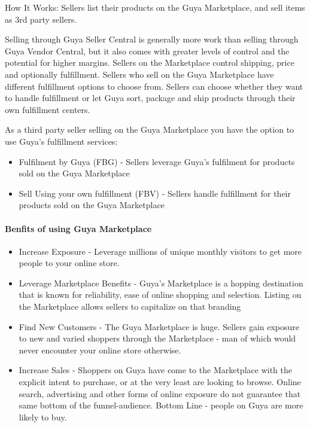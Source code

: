 How It Works: Sellers list their products on the Guya Marketplace, and sell items as 3rd party sellers.

Selling through Guya Seller Central is generally more work than selling through Guya Vendor Central, but it also comes with greater levels of control and the potential for higher margins. Sellers on the Marketplace control shipping, price and optionally fulfillment. Sellers who sell on the Guya Marketplace have different fulfillment options to choose from. Sellers can choose whether they want to handle fulfillment or let Guya sort, package and ship products through their own fulfillment centers.

As a third party seller selling on the Guya Marketplace you have the option to use Guya's fulfillment services:

\begin{itemize}
	\item Fulfilment by Guya (FBG) - Sellers leverage Guya's fulfilment for products sold on the Guya Marketplace
	\item Sell Using your own fulfillment (FBV) - Sellers handle fulfillment for their products sold on the Guya Marketplace
\end{itemize}

\paragraph{Benfits of using Guya Marketplace}
\begin{itemize}
	\item Increase Exposure - Leverage millions of unique monthly visitors to get more people to your online store.
	\item Leverage Marketplace Benefits - Guya's Marketplace is a hopping destination that is known for reliability, ease of online shopping and selection. Listing on the Marketplace allows sellers to capitalize on that branding 
	\item Find New Customers - The Guya Marketplace is huge. Sellers gain exposure to new and varied shoppers through the Marketplace - man of which would never encounter your online store otherwise.
	\item Increase Sales - Shoppers on Guya have come to the Marketplace with the explicit intent to purchase, or at the very least are looking to browse. Online search, advertising and other forms of online exposure do not guarantee that same bottom of the funnel-audience. Bottom Line - people on Guya are more likely to buy.
\end{itemize}


